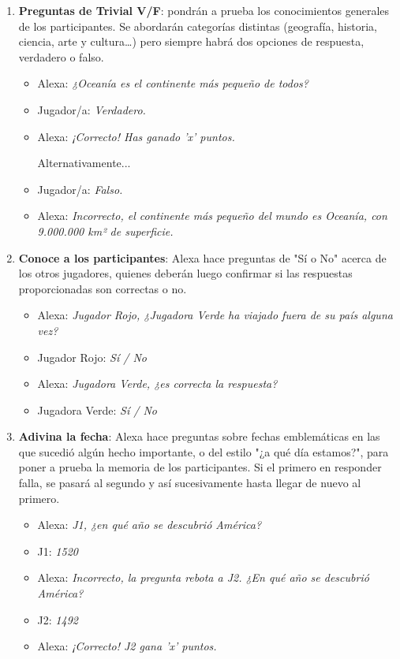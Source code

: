 \begin{enumerate}
	\item \textbf{Preguntas de Trivial V/F}: pondrán a prueba los conocimientos generales de los participantes. Se abordarán categorías distintas (geografía, historia, ciencia, arte y cultura…) pero siempre habrá dos opciones de respuesta, verdadero o falso.
	\begin{itemize}
		\item Alexa: \textit{¿Oceanía es el continente más pequeño de todos?}
		\item Jugador/a: \textit{Verdadero.}
		\item Alexa: \textit{¡Correcto! Has ganado 'x' puntos.}
		
		Alternativamente...
		\item Jugador/a: \textit{Falso.}
		\item Alexa: \textit{Incorrecto, el continente más pequeño del mundo es Oceanía, con 9.000.000 km² de superficie.}
	\end{itemize}
	
	\item \textbf{Conoce a los participantes}: Alexa hace preguntas de "Sí o No" acerca de los otros jugadores, quienes deberán luego confirmar si las respuestas proporcionadas son correctas o no.
	\begin{itemize}
		\item Alexa: \textit{Jugador Rojo, ¿Jugadora Verde ha viajado fuera de su país alguna vez?}
		\item Jugador Rojo: \textit{Sí / No}
		\item Alexa: \textit{Jugadora Verde, ¿es correcta la respuesta?}
		\item Jugadora Verde: \textit{Sí / No}
	\end{itemize}
	
	\item \textbf{Adivina la fecha}: Alexa hace preguntas sobre fechas emblemáticas en las que sucedió algún hecho importante, o del estilo "¿a qué día estamos?", para poner a prueba la memoria de los participantes. Si el primero en responder falla, se pasará al segundo y así sucesivamente hasta llegar de nuevo al primero.
	\begin{itemize}
		\item Alexa: \textit{J1, ¿en qué año se descubrió América?}
		\item J1: \textit{1520}
		\item Alexa: \textit{Incorrecto, la pregunta rebota a J2. ¿En qué año se descubrió América?}
		\item J2: \textit{1492}
		\item Alexa: \textit{¡Correcto! J2 gana 'x' puntos.}
	\end{itemize}
	

\end{enumerate}
